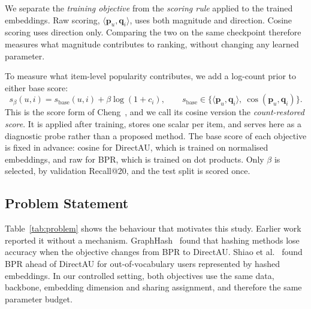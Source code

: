 We separate the \emph{training objective} from the \emph{scoring rule} applied to the trained embeddings. Raw scoring, $\langle\mathbf{p}_u,\mathbf{q}_i\rangle$, uses both magnitude and direction. Cosine scoring uses direction only. Comparing the two on the same checkpoint therefore measures what magnitude contributes to ranking, without changing any learned parameter.

To measure what item-level popularity contributes, we add a log-count prior to either base score:
\begin{equation}
  s_\beta(u,i)=s_{\mathrm{base}}(u,i)+\beta\log(1+c_i),
  \qquad
  s_{\mathrm{base}}\in\bigl\{\langle\mathbf{p}_u,\mathbf{q}_i\rangle,\ \cos(\mathbf{p}_u,\mathbf{q}_i)\bigr\}.
  \label{eq:score}
\end{equation}
This is the score form of Cheng~\cite[Eq.~53]{Cheng2026}, and we call its cosine version the \emph{count-restored score}. It is applied after training, stores one scalar per item, and serves here as a diagnostic probe rather than a proposed method. The base score of each objective is fixed in advance: cosine for DirectAU, which is trained on normalised embeddings, and raw for BPR, which is trained on dot products. Only $\beta$ is selected, by validation Recall@20, and the test split is scored once.

\subsection{Problem Statement}
\label{sec:prelim-problem}

Table~\ref{tab:problem} shows the behaviour that motivates this study. Earlier work reported it without a mechanism. GraphHash~\cite{GraphHash} found that hashing methods lose accuracy when the objective changes from BPR to DirectAU. Shiao et al.~\cite{Shiao2025} found BPR ahead of DirectAU for out-of-vocabulary users represented by hashed embeddings. In our controlled setting, both objectives use the same data, backbone, embedding dimension and sharing assignment, and therefore the same parameter budget.

